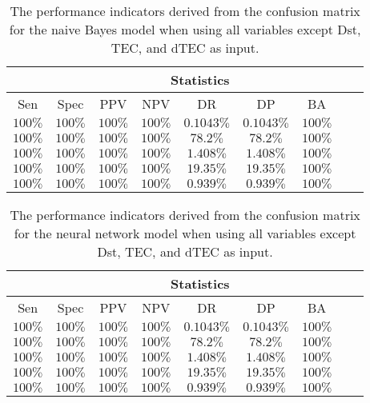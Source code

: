 \begin{table}[!ht]
	\centering
	\begin{tabular}{|c|c|c|c|c|c|c|c|c|}
		\hline
		 & \multicolumn{7}{c|}{Statistics} \\ \hline
		Sen & Spec & PPV & NPV & DR & DP & BA \\ \hline
		$100\%$ & $100\%$ & $100\%$ & $100\%$ & $0.1043\%$ & $0.1043\%$ & $100\%$ \\ \hline
		$100\%$ & $100\%$ & $100\%$ & $100\%$ & $78.2\%$ & $78.2\%$ & $100\%$ \\ \hline
		$100\%$ & $100\%$ & $100\%$ & $100\%$ & $1.408\%$ & $1.408\%$ & $100\%$ \\ \hline
		$100\%$ & $100\%$ & $100\%$ & $100\%$ & $19.35\%$ & $19.35\%$ & $100\%$ \\ \hline
		$100\%$ & $100\%$ & $100\%$ & $100\%$ & $0.939\%$ & $0.939\%$ & $100\%$ \\ \hline
	\end{tabular}
	\caption{The performance indicators derived from the confusion matrix for the naive Bayes model when using all variables except Dst, TEC, and dTEC as input.}
	\label{tab:cs:noTEC:nb}
\end{table}

\begin{table}[!ht]
	\centering
	\begin{tabular}{|c|c|c|c|c|c|c|c|c|}
		\hline
		 & \multicolumn{7}{c|}{Statistics} \\ \hline
		Sen & Spec & PPV & NPV & DR & DP & BA \\ \hline
		$100\%$ & $100\%$ & $100\%$ & $100\%$ & $0.1043\%$ & $0.1043\%$ & $100\%$ \\ \hline
		$100\%$ & $100\%$ & $100\%$ & $100\%$ & $78.2\%$ & $78.2\%$ & $100\%$ \\ \hline
		$100\%$ & $100\%$ & $100\%$ & $100\%$ & $1.408\%$ & $1.408\%$ & $100\%$ \\ \hline
		$100\%$ & $100\%$ & $100\%$ & $100\%$ & $19.35\%$ & $19.35\%$ & $100\%$ \\ \hline
		$100\%$ & $100\%$ & $100\%$ & $100\%$ & $0.939\%$ & $0.939\%$ & $100\%$ \\ \hline
	\end{tabular}
	\caption{The performance indicators derived from the confusion matrix for the neural network model when using all variables except Dst, TEC, and dTEC as input.}
	\label{tab:cs:noTEC:nnet}
\end{table}

